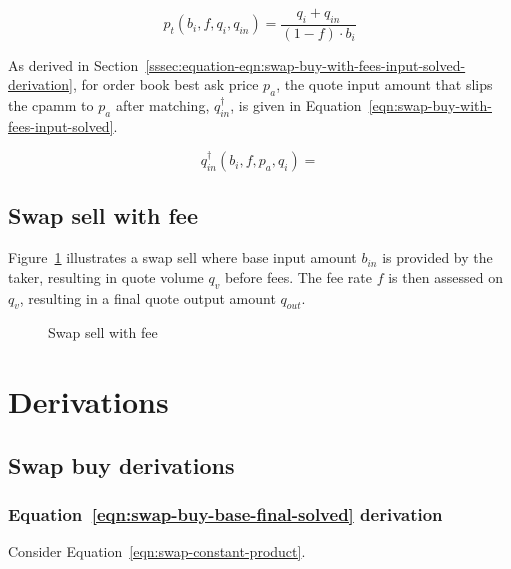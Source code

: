 \documentclass[table, twocolumn]{article}
\begin{document}
\begin{equation}\label{eqn:swap-taker-execution-price-buy-solved}
  p_t (b_i, f, q_i, q_{in}) = \frac{q_i + q_{in}}{(1 - f) \cdot b_i}
\end{equation}

As derived in
Section~\ref{sssec:equation-eqn:swap-buy-with-fees-input-solved-derivation}, for order
book best ask price $p_a$, the quote input amount that slips the \gls*{cpamm} to
$p_a$ after matching, $q_{in}^{\dagger}$, is given in
Equation~\ref{eqn:swap-buy-with-fees-input-solved}.

\begin{equation}\label{eqn:swap-buy-with-fees-input-solved}
  q_{in}^{\dagger} (b_i, f, p_a, q_i) =
\end{equation}

\subsection{Swap sell with fee}\label{ssec:swap-sell-with-fee}

Figure~\ref{fig:swap-sell-with-fee} illustrates a swap sell where base input amount
$b_{in}$ is provided by the taker, resulting in quote volume $q_v$ before fees. The fee
rate $f$ is then assessed on $q_v$, resulting in a final quote output amount $q_{out}$.

\begin{figure}[!htb]
	\centering
	
	\caption{Swap sell with fee}\label{fig:swap-sell-with-fee}
\end{figure}

\section{Derivations}\label{sec:derivations}

\subsection{Swap buy derivations}\label{ssec:swap-buy-derivations}

\subsubsection{Equation~\ref{eqn:swap-buy-base-final-solved} derivation}%
\label{sssec:equation-eqn-swap-buy-base-final-solved-derivation}

Consider Equation~\ref{eqn:swap-constant-product}.
\end{document}
